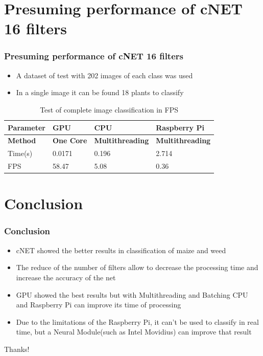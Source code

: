 \documentclass[10pt,a4paper]{beamer}
\begin{document}
\section{Presuming performance of cNET 16 filters}
\begin{frame}
\frametitle{Presuming performance of cNET 16 filters}
\begin{itemize}
	\item A dataset of test with 202 images of each class was used
	\item In a single image it can be found 18 plants to classify
\end{itemize}
\begin{table}[h!]
\centering
\renewcommand{\arraystretch}{1.2}
\caption{Test of complete image classification in FPS}
\label{table:6}
\begin{tabular}[c c c c]{|p{1.8 cm} p{1.5cm} p{2.1cm} p{2.3cm}|} 
 \hline
 \textbf{Parameter} &\textbf{GPU } & \textbf{CPU} & \textbf{Raspberry Pi} \\ 
 \hline
  \textbf{Method} &\textbf{One Core} & \textbf{Multithreading} & \textbf{Multithreading} \\ 
 \hline
 Time(s) & 0.0171 & 0.196 & 2.714 \\ [0.95ex]
 FPS & 58.47 & 5.08 & 0.36 \\ [0.95ex]
 \hline
\end{tabular}
\end{table}
\end{frame}
\section{Conclusion}
\begin{frame}
\frametitle{Conclusion}
\begin{itemize}
\item cNET showed the better results in classification of maize and weed
\item The reduce of the number of filters allow to decrease the processing time and increase the accuracy of the net
\item GPU showed the best results but with Multithreading and Batching CPU and Raspberry Pi can improve its time of processing 
\item Due to the limitations of the Raspberry Pi, it can't be used to classify in real time, but a Neural Module(such as Intel Movidius) can improve that result
\end{itemize}
\end{frame}
\large
\begin{frame}
\begin{center}
Thanks!
\end{center}
\end{frame}

%
%
\end{document}
